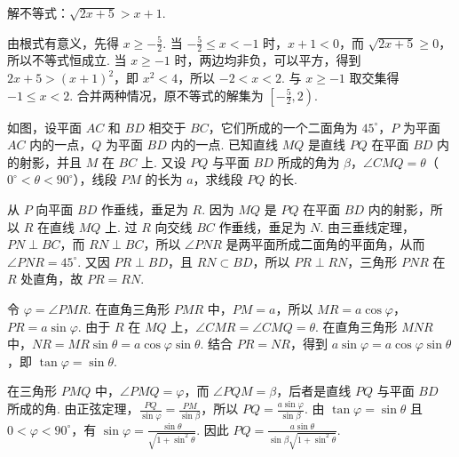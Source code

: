 \begin{problem}

解不等式：\(\sqrt{2x+5}>x+1\).

\begin{solution}
由根式有意义，先得 \(x\geqslant-\frac{5}{2}\). 当 \(-\frac{5}{2}\leqslant x<-1\) 时，\(x+1<0\)，而 \(\sqrt{2x+5}\geqslant0\)，所以不等式恒成立. 当 \(x\geqslant-1\) 时，两边均非负，可以平方，得到 \(2x+5>(x+1)^2\)，即 \(x^2<4\)，所以 \(-2<x<2\). 与 \(x\geqslant-1\) 取交集得 \(-1\leqslant x<2\). 合并两种情况，原不等式的解集为 \(\left[-\frac{5}{2},2\right)\).
\end{solution}
\end{problem}

\begin{problem}

如图，设平面 \(AC\) 和 \(BD\) 相交于 \(BC\)，它们所成的一个二面角为 \(45^{\circ}\)，\(P\) 为平面 \(AC\) 内的一点，\(Q\) 为平面 \(BD\) 内的一点. 已知直线 \(MQ\) 是直线 \(PQ\) 在平面 \(BD\) 内的射影，并且 \(M\) 在 \(BC\) 上. 又设 \(PQ\) 与平面 \(BD\) 所成的角为 \(\beta\)，\(\angle CMQ=\theta\)（\(0^{\circ}<\theta<90^{\circ}\)），线段 \(PM\) 的长为 \(a\)，求线段 \(PQ\) 的长.


\begin{solution}
从 \(P\) 向平面 \(BD\) 作垂线，垂足为 \(R\). 因为 \(MQ\) 是 \(PQ\) 在平面 \(BD\) 内的射影，所以 \(R\) 在直线 \(MQ\) 上. 过 \(R\) 向交线 \(BC\) 作垂线，垂足为 \(N\). 由三垂线定理，\(PN\perp BC\)，而 \(RN\perp BC\)，所以 \(\angle PNR\) 是两平面所成二面角的平面角，从而 \(\angle PNR=45^{\circ}\). 又因 \(PR\perp BD\)，且 \(RN\subset BD\)，所以 \(PR\perp RN\)，三角形 \(PNR\) 在 \(R\) 处直角，故 \(PR=RN\).

令 \(\varphi=\angle PMR\). 在直角三角形 \(PMR\) 中，\(PM=a\)，所以 \(MR=a\cos\varphi\)，\(PR=a\sin\varphi\). 由于 \(R\) 在 \(MQ\) 上，\(\angle CMR=\angle CMQ=\theta\). 在直角三角形 \(MNR\) 中，\(NR=MR\sin\theta=a\cos\varphi\sin\theta\). 结合 \(PR=NR\)，得到 \(a\sin\varphi=a\cos\varphi\sin\theta\)，即 \(\tan\varphi=\sin\theta\).

在三角形 \(PMQ\) 中，\(\angle PMQ=\varphi\)，而 \(\angle PQM=\beta\)，后者是直线 \(PQ\) 与平面 \(BD\) 所成的角. 由正弦定理，\(\frac{PQ}{\sin\varphi}=\frac{PM}{\sin\beta}\)，所以 \(PQ=\frac{a\sin\varphi}{\sin\beta}\). 由 \(\tan\varphi=\sin\theta\) 且 \(0<\varphi<90^{\circ}\)，有 \(\sin\varphi=\frac{\sin\theta}{\sqrt{1+\sin^2\theta}}\). 因此 \(PQ=\frac{a\sin\theta}{\sin\beta\sqrt{1+\sin^2\theta}}\).
\end{solution}
\end{problem}

